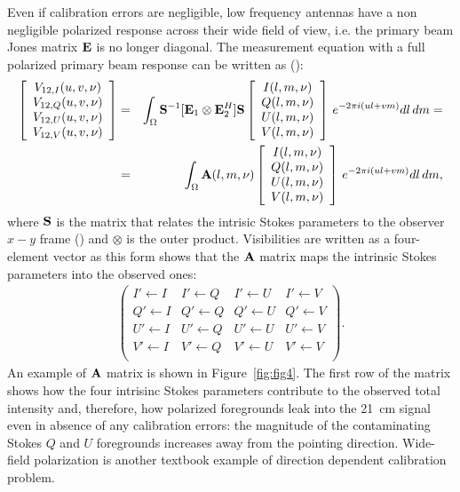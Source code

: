 \begin{itemize}
Even if calibration errors are negligible, low frequency antennas have a non negligible polarized response across their wide field of view, i.e. the primary beam Jones matrix ${\bf E}$ is no longer diagonal. The measurement equation with a full polarized primary beam response can be written as (\cite{nunhokee17}):
\begin{eqnarray}
    \left[ 
    \begin{array}{cc}
    V_{12,I} (u,v,\nu)\\
    V_{12,Q} (u,v,\nu)\\
    V_{12,U} (u,v,\nu)\\
    V_{12,V} (u,v,\nu)
    \end{array}
    \right] & = & \int_\Omega{ {\bf S}^{-1} [ {\bf E}_1 \otimes {\bf E}_2^H ] {\bf S} 
    \left[ 
    \begin{array}{cc}
    I (l,m,\nu)\\
    Q (l,m,\nu)\\
    U (l,m,\nu)\\
    V (l,m,\nu)
    \end{array}
    \right]
     \, e^{-2 \pi i (ul + vm)} dl \, dm } = \nonumber \\
     & = & \int_\Omega{ {\bf A} (l,m,\nu) 
    \left[ 
    \begin{array}{cc}
    I (l,m,\nu)\\
    Q (l,m,\nu)\\
    U (l,m,\nu)\\
    V (l,m,\nu)
    \end{array}
    \right]
     \, e^{-2 \pi i (ul + vm)} dl \, dm },
\label{eq:sec:8}
\end{eqnarray} 
where ${\bf S}$ is the matrix that relates the intrisic Stokes parameters to the observer $x-y$ frame (\cite{hamaker96}) and $\otimes$ is the outer product. Visibilities are written as a four-element vector as this form shows that the ${\bf A}$ matrix maps the intrinsic Stokes parameters into the observed ones: 
\begin{eqnarray}
    \left(
    \begin{array}{cccc}
    I' \leftarrow I & I' \leftarrow Q & I' \leftarrow U & I' \leftarrow V \\
    Q' \leftarrow I & Q' \leftarrow Q & Q' \leftarrow U & Q' \leftarrow V \\
    U' \leftarrow I & U' \leftarrow Q & U' \leftarrow U & U' \leftarrow V \\
    V' \leftarrow I & V' \leftarrow Q & V' \leftarrow U & V' \leftarrow V \\
    \end{array}
    \right).
\label{eq:sec:9}
\end{eqnarray} 
An example of ${\bf A}$ matrix is shown in Figure~\ref{fig:fig4}. The first row of the matrix shows how the four intrisinc Stokes parameters contribute to the observed total intensity and, therefore, how polarized foregrounds leak into the 21~cm signal even in absence of any calibration errors: the magnitude of the contaminating Stokes $Q$ and $U$ foregrounds increases away from the pointing direction. Wide-field polarization is another textbook example of direction dependent calibration problem.


\end{itemize}
